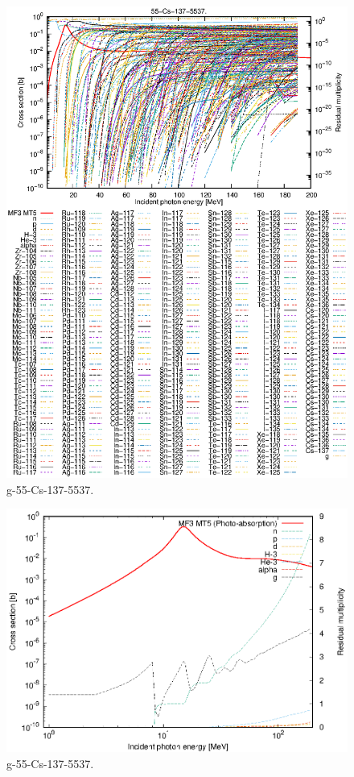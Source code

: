 \begin{figure}
 \includegraphics[width=\linewidth]{eps/g_55-Cs-137_5537.eps}
  \caption{g-55-Cs-137-5537.}
\end{figure}
\newpage \clearpage

\begin{figure}
 \includegraphics[width=\linewidth]{eps-log/g_55-Cs-137_5537.eps}
 \caption{g-55-Cs-137-5537.}
\end{figure}
\newpage \clearpage

